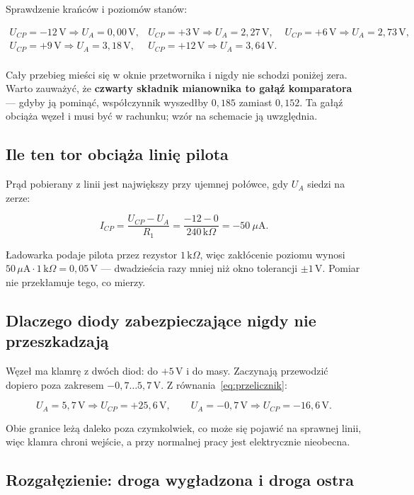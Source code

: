 \documentclass[a4paper,11pt]{article}
\newcommand{\kohm}{\,\mathrm{k}\Omega}
\newcommand{\volt}{\,\mathrm{V}}
\begin{document}
Sprawdzenie krańców i poziomów stanów:

\[
\begin{array}{llll}
U_{CP}=-12\volt \Rightarrow U_A=0{,}00\volt, &
U_{CP}=+3\volt  \Rightarrow U_A=2{,}27\volt, &
U_{CP}=+6\volt  \Rightarrow U_A=2{,}73\volt, \\[1mm]
U_{CP}=+9\volt  \Rightarrow U_A=3{,}18\volt, &
U_{CP}=+12\volt \Rightarrow U_A=3{,}64\volt. & \\
\end{array}
\]

Cały przebieg mieści się w oknie przetwornika i nigdy nie schodzi poniżej zera.
Warto zauważyć, że \textbf{czwarty składnik mianownika to gałąź komparatora} ---
gdyby ją pominąć, współczynnik wyszedłby $0{,}185$ zamiast $0{,}152$. Ta gałąź
obciąża węzeł i musi być w rachunku; wzór na schemacie ją uwzględnia.

\subsection{Ile ten tor obciąża linię pilota}

Prąd pobierany z linii jest największy przy ujemnej połówce, gdy $U_A$ siedzi
na zerze:

\[
I_{CP}=\frac{U_{CP}-U_A}{R_1}=\frac{-12-0}{240\kohm}=-50\ \mu\mathrm{A}.
\]

Ładowarka podaje pilota przez rezystor $1\kohm$, więc zakłócenie poziomu wynosi
$50\,\mu\mathrm{A}\cdot 1\kohm = 0{,}05\volt$ --- dwadzieścia razy mniej niż okno
tolerancji $\pm1\volt$. Pomiar nie przekłamuje tego, co mierzy.

\subsection{Dlaczego diody zabezpieczające nigdy nie przeszkadzają}

Węzeł ma klamrę z dwóch diod: do $+5\volt$ i do masy. Zaczynają przewodzić dopiero
poza zakresem $-0{,}7\ldots5{,}7\volt$. Z równania~\eqref{eq:przelicznik}:

\[
U_A=5{,}7\volt \Rightarrow U_{CP}=+25{,}6\volt,
\qquad
U_A=-0{,}7\volt \Rightarrow U_{CP}=-16{,}6\volt .
\]

Obie granice leżą daleko poza czymkolwiek, co może się pojawić na sprawnej linii,
więc klamra chroni wejście, a przy normalnej pracy jest elektrycznie nieobecna.

\subsection{Rozgałęzienie: droga wygładzona i droga ostra}
\end{document}
